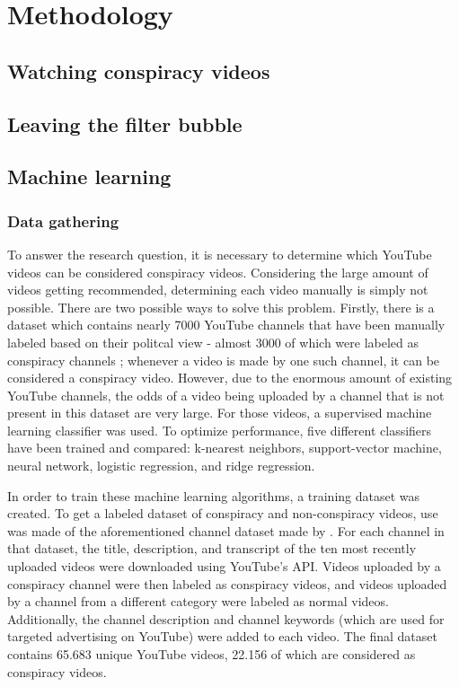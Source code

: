 \documentclass[../main.tex]{subfiles}
\begin{document}
\section{Methodology}
\subsection{Watching conspiracy videos}

\subsection{Leaving the filter bubble}

\subsection{Machine learning}
\subsubsection{Data gathering}
To answer the research question, it is necessary to determine which YouTube videos can be considered
conspiracy videos. Considering the large amount of videos getting recommended, determining each video
manually is simply not possible. There are two possible ways to solve this problem. Firstly, there is a
dataset which contains nearly 7000 YouTube channels that have been manually labeled based on their
politcal view - almost 3000 of which were labeled as conspiracy channels \citep{ledwich2019algorithmic};
whenever a video is made by one such channel, it can be considered a conspiracy video. However, due to
the enormous amount of existing YouTube channels, the odds of a video being uploaded by a channel that
is not present in this dataset are very large. For those videos, a supervised machine learning
classifier was used. To optimize performance, five different classifiers have been trained and compared:
k-nearest neighbors, support-vector machine, neural network, logistic regression, and ridge regression. 

In order to train these machine learning algorithms, a training dataset was created. To get a labeled
dataset of conspiracy and non-conspiracy videos, use was made of the aforementioned channel dataset made
by \citet{ledwich2019algorithmic}. For each channel in that dataset, the title, description, and
transcript of the ten most recently uploaded videos were downloaded using YouTube's API. Videos uploaded
by a conspiracy channel were then labeled as conspiracy videos, and videos uploaded by a channel from a
different category were labeled as normal videos. Additionally, the channel description and channel
keywords (which are used for targeted advertising on YouTube) were added to each video. The final
dataset contains 65.683 unique YouTube videos, 22.156 of which are considered as conspiracy videos. 
\end{document}
